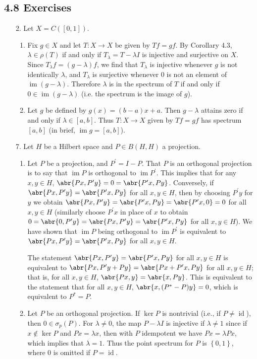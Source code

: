 \documentclass[11pt,leqno]{article}
\theoremstyle{plain}
\theoremstyle{definition}
\numberwithin{equation}{section}
\numberwithin{lem}{section}
\newcommand{\cbr}[1]{\left\{#1\right\}}
\DeclareMathOperator{\im}{im}
\DeclareMathOperator{\id}{id}
\begin{document}
\subsection*{4.8 Exercises}
\begin{enumerate}
    \item[2.] Let $X = C([0,1])$.
    \begin{enumerate}
        \item Fix $g\in X$ and let $T\colon X\to X$ be given by $Tf = gf$. By Corollary 4.3, $\lambda\in \rho(T)$ if and only if $T_\lambda = T-\lambda I$ is injective and surjective on $X$. Since $T_\lambda f= (g-\lambda)f$, we find that $T_\lambda$ is injective whenever $g$ is not identically $\lambda$, and $T_\lambda$ is surjective whenever $0$ is not an element of $\im (g-\lambda)$. Therefore $\lambda$ is in the spectrum of $T$ if and only if $0\in \im(g-\lambda)$ (i.e. the spectrum is the image of $g$).
        \item Let $g$ be defined by $g(x) = (b-a)x + a$. Then $g-\lambda$ attains zero if and only if $\lambda\in [a,b]$. Thus $T\colon X\to X$ given by $Tf = gf$ has spectrum $[a,b]$ (in brief, $\im g = [a,b]$).
    \end{enumerate}
    \item[7.] Let $H$ be a Hilbert space and $P\in B(H,H)$ a projection.
    \begin{enumerate}
        \item Let $P$ be a projection, and $P^\prime = I-P$. That $P$ is an orthogonal projection is to say that $\im P$ is orthogonal to $\im P^\prime$. This implies that for any $x,y\in H$, $\abr{Px,P^\prime y} = 0 = \abr{P^\prime x, Py}$. Conversely, if $\abr{Px,P^\prime y} = \abr{P^\prime x, Py}$ for all $x,y\in H$, then by choosing $P^\prime y$ for $y$ we obtain $\abr{Px,P^\prime y} = \abr{P^\prime x, Py} = \abr{P^\prime x, 0} = 0$ for all $x,y\in H$ (similarly choose $P^\prime x$ in place of $x$ to obtain $0 = \abr{0,P^\prime y} = \abr{Px,P^\prime y} = \abr{P^\prime x, Py}$ for all $x,y\in H$). We have shown that $\im P$ being orthogonal to $\im P^\prime$ is equivalent to $\abr{Px,P^\prime y} = \abr{P^\prime x, Py}$ for all $x,y\in H$.
        
        The statement $\abr{Px,P^\prime y} = \abr{P^\prime x, Py}$ for all $x,y\in H$ is equivalent to $\abr{Px,P^\prime y + Py} = \abr{Px + P^\prime x, Py}$ for all $x,y\in H$; that is, for all $x,y\in H$, $\abr{Px,y} = \abr{x,Py}$. This is equivalent to the statement that for all $x,y\in H$, $\abr{x,(P^\ast-P)y} = 0$, which is equivalent to $P^\ast = P$.
        \item Let $P$ be an orthogonal projection. If $\ker P$ is nontrivial (i.e., if $P\neq \id$), then $0\in \sigma_p(P)$. For $\lambda\neq 0$, the map $P-\lambda I$ is injective if $\lambda\neq 1$ since if $x\not\in\ker P$ and $Px=\lambda x$, then with $P$ idempotent we have $Px = \lambda Px$, which implies that $\lambda = 1$. Thus the point spectrum for $P$ is $\cbr{0,1}$, where $0$ is omitted if $P = \id$.
        

\end{enumerate}
\end{enumerate}
\end{document}
